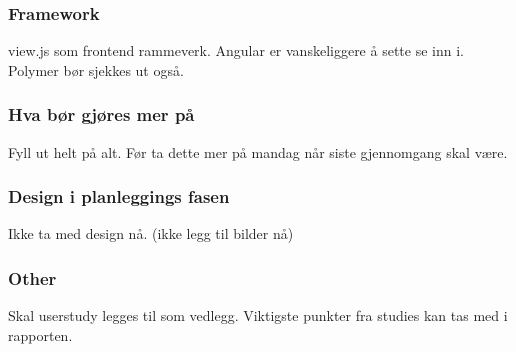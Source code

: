 \subsubsection*{Framework}
view.js som frontend rammeverk. Angular er vanskeliggere å sette se inn i. Polymer bør sjekkes ut også. 

\subsubsection*{Hva bør gjøres mer på}
Fyll ut helt på alt. Før ta dette mer på mandag når siste gjennomgang skal være.

\subsubsection*{Design i planleggings fasen}
Ikke ta med design nå. (ikke legg til bilder nå)

\subsubsection*{Other}
Skal userstudy legges til som vedlegg. Viktigste punkter fra studies kan tas med i rapporten.

\newpage
